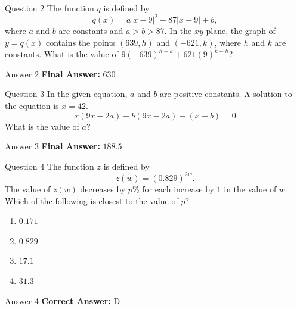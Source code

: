 \documentclass{beamer}
\begin{document}
\begin{frame}{Question 2}
\small
The function \(q\) is defined by
\[
q(x) = a|x - 9|^2 - 87|x - 9| + b,
\]
where \(a\) and \(b\) are constants and \(a > b > 87\). In the \(xy\)-plane, the graph of \(y = q(x)\) contains the points \((639, h)\) and \((-621, k)\), where \(h\) and \(k\) are constants.
What is the value of \(9(-639)^{h-k} + 621(9)^{k-h}\)?
\end{frame}
\begin{frame}{Answer 2}
\small
\textbf{Final Answer:} $\boxed{630}$
\end{frame}

\begin{frame}{Question 3}
\small
In the given equation, \(a\) and \(b\) are positive constants. A solution to the equation is \(x = 42\).
\[
x(9x - 2a) + b(9x - 2a) - (x + b) = 0
\]
What is the value of \(a\)?
\end{frame}
\begin{frame}{Answer 3}
\small
\textbf{Final Answer:} $\boxed{188.5}$
\end{frame}

\begin{frame}{Question 4}
\small
The function \(z\) is defined by
\[
z(w) = (0.829)^{2w}.
\]
The value of \(z(w)\) decreases by \(p\%\) for each increase by \(1\) in the value of \(w\). Which of the following is closest to the value of \(p\)?
\vspace{0.35cm}
\begin{enumerate}
    \item[A.] \(0.171\)
    \item[B.] \(0.829\)
    \item[C.] \(17.1\)
    \item[D.] \(31.3\)
\end{enumerate}
\end{frame}
\begin{frame}{Answer 4}
\small
\textbf{Correct Answer:} D
\end{frame}
\end{document}
